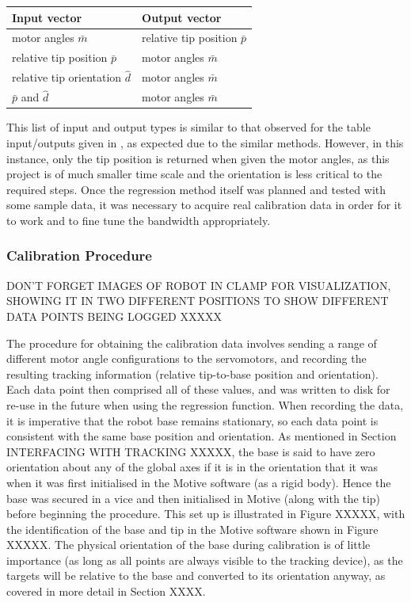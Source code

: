 \documentclass[11pt]{article}
\begin{document}
\begin{center}
\label{table:regressionOutputs}
\begin{tabularx}{0.66\textwidth}{ | >{\centering\arraybackslash}p{12em} |>{\centering\arraybackslash}X|} 
\hline
Input vector & Output vector\\
\hline
motor angles $\bar{m}$ & relative tip position $\bar{p}$ \\
relative tip position $\bar{p}$ & motor angles $\bar{m}$ \\
relative tip orientation $\hat{d}$ & motor angles $\bar{m}$ \\
$\bar{p}$ and $\hat{d}$ & motor angles $\bar{m}$\\
\hline
\end{tabularx}
\end{center}

This list of input and output types is similar to that observed for the table input/outputs given in \cite{GreggSmithDesign}, as expected due to the similar methods. However, in this instance, only the tip position is returned when given the motor angles, as this project is of much smaller time scale and the orientation is less critical to the required steps. Once the regression method itself was planned and tested with some sample data, it was necessary to acquire real calibration data in order for it to work and to fine tune the bandwidth appropriately.


\subsubsection{Calibration Procedure}
DON'T FORGET IMAGES OF ROBOT IN CLAMP FOR VISUALIZATION, SHOWING IT IN TWO DIFFERENT POSITIONS TO SHOW DIFFERENT DATA POINTS BEING LOGGED XXXXX

The procedure for obtaining the calibration data involves sending a range of different motor angle configurations to the servomotors, and recording the resulting tracking information (relative tip-to-base position and orientation). Each data point then comprised all of these values, and was written to disk for re-use in the future when using the regression function. When recording the data, it is imperative that the robot base remains stationary, so each data point is consistent with the same base position and orientation. As mentioned in Section INTERFACING WITH TRACKING XXXXX, the base is said to have zero orientation about any of the global axes if it is in the orientation that it was when it was first initialised in the Motive software (as a rigid body). Hence the base was secured in a vice and then initialised in Motive (along with the tip) before beginning the procedure. This set up is illustrated in Figure XXXXX, with the identification of the base and tip in the Motive software shown in Figure XXXXX. The physical orientation of the base during calibration is of little importance (as long as all points are always visible to the tracking device), as the targets will be relative to the base and converted to its orientation anyway, as covered in more detail in Section XXXX.
\end{document}
